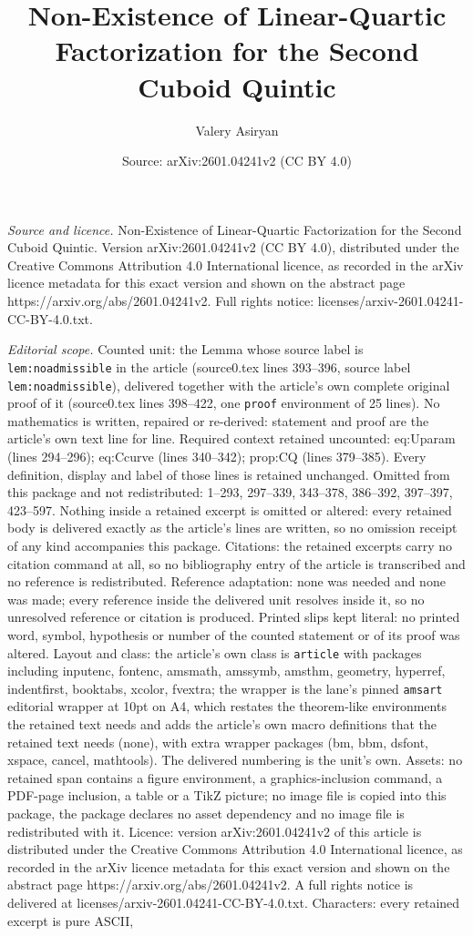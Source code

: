 \documentclass[10pt,a4paper]{amsart}
\title[Non-Existence of Linear-Quartic Factorization for the Second]{Non-Existence of Linear-Quartic Factorization for the Second Cuboid Quintic}
\author{Valery Asiryan}
\date{Source: arXiv:2601.04241v2 (CC BY 4.0)}
\begin{document}
\maketitle

\noindent\emph{Source and licence.} Non-Existence of Linear-Quartic Factorization for the Second Cuboid Quintic. Version arXiv:2601.04241v2 (CC BY 4.0), distributed under the Creative Commons Attribution 4.0 International licence, as recorded in the arXiv licence metadata for this exact version and shown on the abstract page https://arxiv.org/abs/2601.04241v2. Full rights notice: licenses/arxiv-2601.04241-CC-BY-4.0.txt.\par\smallskip

\noindent\textit{Editorial scope.} Counted unit: the Lemma whose source label is \texttt{lem:noadmissible} in the article (source0.tex lines 393--396, source label \texttt{lem:noadmissible}), delivered together with the article's own complete original proof of it (source0.tex lines 398--422, one \texttt{proof} environment of 25 lines). No mathematics is written, repaired or re-derived: statement and proof are the article's own text line for line. Required context retained uncounted: eq:Uparam (lines 294--296); eq:Ccurve (lines 340--342); prop:CQ (lines 379--385). Every definition, display and label of those lines is retained unchanged. Omitted from this package and not redistributed: 1--293, 297--339, 343--378, 386--392, 397--397, 423--597. Nothing inside a retained excerpt is omitted or altered: every retained body is delivered exactly as the article's lines are written, so no omission receipt of any kind accompanies this package. Citations: the retained excerpts carry no citation command at all, so no bibliography entry of the article is transcribed and no reference is redistributed. Reference adaptation: none was needed and none was made; every reference inside the delivered unit resolves inside it, so no unresolved reference or citation is produced. Printed slips kept literal: no printed word, symbol, hypothesis or number of the counted statement or of its proof was altered. Layout and class: the article's own class is \texttt{article} with packages including inputenc, fontenc, amsmath, amssymb, amsthm, geometry, hyperref, indentfirst, booktabs, xcolor, fvextra; the wrapper is the lane's pinned \texttt{amsart} editorial wrapper at 10pt on A4, which restates the theorem-like environments the retained text needs and adds the article's own macro definitions that the retained text needs (none), with extra wrapper packages (bm, bbm, dsfont, xspace, cancel, mathtools). The delivered numbering is the unit's own. Assets: no retained span contains a figure environment, a graphics-inclusion command, a PDF-page inclusion, a table or a TikZ picture; no image file is copied into this package, the package declares no asset dependency and no image file is redistributed with it. Licence: version arXiv:2601.04241v2 of this article is distributed under the Creative Commons Attribution 4.0 International licence, as recorded in the arXiv licence metadata for this exact version and shown on the abstract page https://arxiv.org/abs/2601.04241v2. A full rights notice is delivered at licenses/arxiv-2601.04241-CC-BY-4.0.txt. Characters: every retained excerpt is pure ASCII, 
\end{document}
